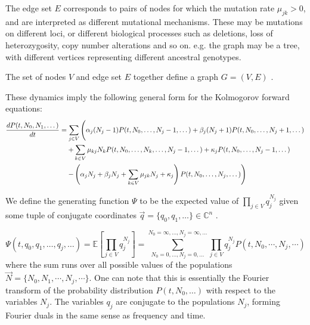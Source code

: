 \documentclass{article}
\begin{document}
The edge set $E$ corresponds to pairs of nodes for which the mutation rate
$\mu_{jk} > 0$, and are interpreted as different mutational mechanisms. These may be
mutations on different loci, or different biological processes such as
deletions, loss of heterozygosity, copy number alterations and so on. 
e.g. the graph may be a tree, with different vertices representing different
ancestral genotypes.

The set of nodes $V$ and edge set $E$ together define a graph $G=(V,E)$
\cite{intrographs}.

These dynamics imply the following general form for the Kolmogorov forward
equations:
\begin{align}
    \frac{d P(t, N_0, N_1, \dots)}{dt} &=
    \sum_{j \in V} \left(
    \alpha_j (N_j - 1) P(t, N_0, \dots, N_j - 1, \dots)
    + \beta_j (N_j + 1) P(t, N_0, \dots, N_j + 1, \dots)
    \vphantom{\sum_a^b}
    \right.
    \nonumber \\
    &\quad \left. + \sum_{k \in V} \mu_{kj} N_k P(t, N_0, \dots, N_k, \dots,  N_j - 1, \dots)
    + \kappa_j P(t, N_0, \dots, N_j - 1, \dots)
    \right.
    \nonumber \\
    &\quad \left. 
    - \left(\alpha_j N_j + \beta_j N_j + \sum_{k \in V} \mu_{jk} N_j + \kappa_j\right)
    P(t, N_0, \dots, N_j, \dots)
    \vphantom{\sum_a^b}
    \right)
    \label{eq:kolmogorov}
\end{align}


We define the generating function $\Psi$ to be the expected value of $\prod_{j \in V}
q_j^{N_j}$ given some tuple of conjugate coordinates $\vec{q} = \{q_0, q_1, \dots\} \in
\mathbb{C}^n$ \cite{gfology}.

\begin{equation}
    \Psi(t,q_0,q_1,\dots,q_j,\dots) 
    = \mathbb{E}\left[\prod_{j \in V} q_j^{N_j}\right]
    = \sum_{N_0 = 0,\dots,N_j=0,\dots}^{N_0 = \infty,\dots, N_j = \infty, \dots} \prod_{j \in V} q_j^{N_j} 
        P(t, N_0, \cdots, N_j, \cdots)
\end{equation}
where the sum runs over all possible values of the populations $\vec{N} = \{N_0,
N_1, \cdots, N_j, \cdots\}$.
One can note that this is essentially the Fourier transform of the probability
distribution $P(t,N_0,\dots)$ with respect to the variables $N_j$. The variables
$q_j$ are conjugate to the populations $N_j$, forming Fourier duals in the same
sense as frequency and time.
\end{document}
